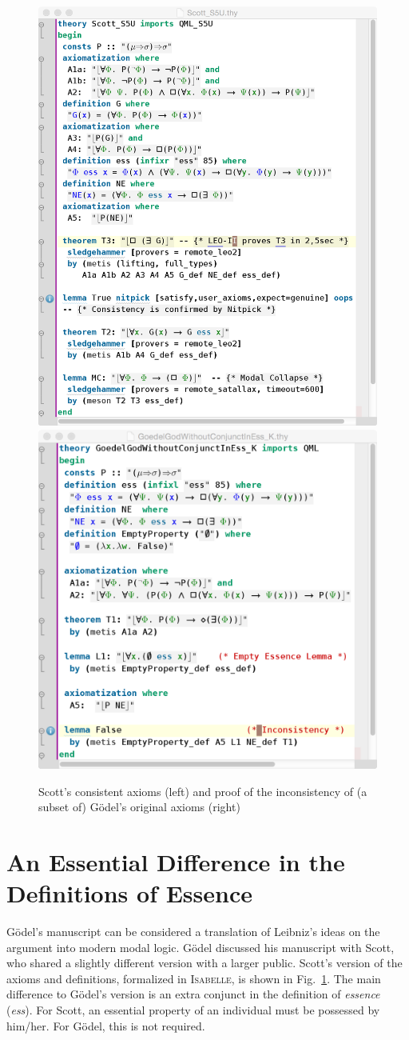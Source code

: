 \documentclass{llncs}
\newcommand{\logic}[1]{\textbf{#1}\xspace}
\newcommand{\SFiveU}{\logic{S5\textsuperscript{U}}}
\begin{document}
\begin{figure}\centering 
  \includegraphics[width=.495\textwidth]{./Scott_S5U.png}
  \includegraphics[width=.495\textwidth]{./InconsistencyIsabelleK.png}
\caption{Scott's consistent axioms (left) and proof of the
  inconsistency of (a subset of) G\"odel's original  axioms (right)}
\label{Scott_Goedel}
\end{figure} 



\section{An Essential Difference in the Definitions of Essence}
\label{sec:history}

G\"odel's manuscript can be considered a translation of Leibniz's
ideas on the argument into modern modal logic. G\"odel
discussed his manuscript with Scott, who shared a slightly different
version with a larger public. Scott's version of the axioms and
definitions, formalized in \textsc{Isabelle}, is shown in
Fig.~\ref{Scott_Goedel}. 
The main difference to G\"odel's version is an
extra conjunct in the definition of \emph{essence} (\emph{ess}). For Scott,
an essential property of an individual must be possessed by
him/her. For G\"odel, this is not required. 
\end{document}
